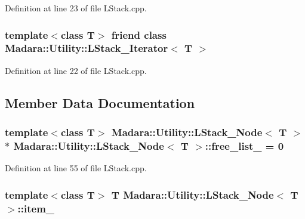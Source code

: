 Definition at line 23 of file LStack.cpp.

\hypertarget{classMadara_1_1Utility_1_1LStack__Node_a0e9bb5bae8c0a301fea3930d9a7781cb}{
\subsubsection[{Madara::Utility::LStack\_\-Iterator$<$ T $>$}]{\setlength{\rightskip}{0pt plus 5cm}template$<$class T$>$ friend class {\bf Madara::Utility::LStack\_\-Iterator}$<$ T $>$}}
\label{d6/dc5/classMadara_1_1Utility_1_1LStack__Node_a0e9bb5bae8c0a301fea3930d9a7781cb}


Definition at line 22 of file LStack.cpp.



\subsection{Member Data Documentation}
\hypertarget{classMadara_1_1Utility_1_1LStack__Node_ac2f0730e3d28efafff13160afb75380a}{
\subsubsection[{free\_\-list\_\-}]{\setlength{\rightskip}{0pt plus 5cm}template$<$class T$>$ {\bf Madara::Utility::LStack\_\-Node}$<$ T $>$ $\ast$ {\bf Madara::Utility::LStack\_\-Node}$<$ T $>$::{\bf free\_\-list\_\-} = 0}}
\label{d6/dc5/classMadara_1_1Utility_1_1LStack__Node_ac2f0730e3d28efafff13160afb75380a}


Definition at line 55 of file LStack.cpp.

\hypertarget{classMadara_1_1Utility_1_1LStack__Node_a6dffb8891f062c524b4363aa0e6b2d36}{
\subsubsection[{item\_\-}]{\setlength{\rightskip}{0pt plus 5cm}template$<$class T$>$ T {\bf Madara::Utility::LStack\_\-Node}$<$ T $>$::{\bf item\_\-}}}
\label{d6/dc5/classMadara_1_1Utility_1_1LStack__Node_a6dffb8891f062c524b4363aa0e6b2d36}


